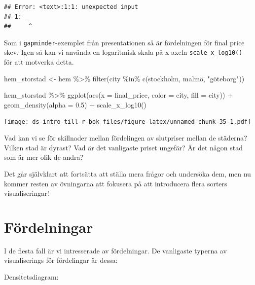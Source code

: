 \documentclass[
]{book}
\newenvironment{Shaded}{\begin{snugshade}}{\end{snugshade}}
\newcommand{\AttributeTok}[1]{\textcolor[rgb]{0.77,0.63,0.00}{#1}}
\newcommand{\FloatTok}[1]{\textcolor[rgb]{0.00,0.00,0.81}{#1}}
\newcommand{\FunctionTok}[1]{\textcolor[rgb]{0.00,0.00,0.00}{#1}}
\newcommand{\NormalTok}[1]{#1}
\newcommand{\OtherTok}[1]{\textcolor[rgb]{0.56,0.35,0.01}{#1}}
\newcommand{\SpecialCharTok}[1]{\textcolor[rgb]{0.00,0.00,0.00}{#1}}
\newcommand{\StringTok}[1]{\textcolor[rgb]{0.31,0.60,0.02}{#1}}
\begin{document}
\begin{verbatim}
## Error: <text>:1:1: unexpected input
## 1: _
##     ^
\end{verbatim}

Som i \texttt{gapminder}-exemplet från presentationen så är fördelningen för final price skev.
Igen så kan vi använda en logaritmisk skala på x axeln \texttt{scale\_x\_log10()} för att motverka detta.

\begin{Shaded}
\begin{Highlighting}[]
\NormalTok{hem\_storstad }\OtherTok{\textless{}{-}}\NormalTok{ hem }\SpecialCharTok{\%\textgreater{}\%} \FunctionTok{filter}\NormalTok{(city }\SpecialCharTok{\%in\%} \FunctionTok{c}\NormalTok{(}\StringTok{\textquotesingle{}stockholm\textquotesingle{}}\NormalTok{, }\StringTok{\textquotesingle{}malmö\textquotesingle{}}\NormalTok{, }\StringTok{"göteborg"}\NormalTok{))}

\NormalTok{hem\_storstad }\SpecialCharTok{\%\textgreater{}\%} \FunctionTok{ggplot}\NormalTok{(}\FunctionTok{aes}\NormalTok{(}\AttributeTok{x =}\NormalTok{ final\_price, }
                            \AttributeTok{color =}\NormalTok{ city, }\AttributeTok{fill =}\NormalTok{ city)) }\SpecialCharTok{+}
  \FunctionTok{geom\_density}\NormalTok{(}\AttributeTok{alpha =} \FloatTok{0.5}\NormalTok{) }\SpecialCharTok{+}
  \FunctionTok{scale\_x\_log10}\NormalTok{()}
\end{Highlighting}
\end{Shaded}

\texttt{[image: ds-intro-till-r-bok\_files/figure-latex/unnamed-chunk-35-1.pdf]}

Vad kan vi se för skillnader mellan fördelingen av slutpriser mellan de städerna?
Vilken stad är dyrast?
Vad är det vanligaste priset ungefär?
Är det någon stad som är mer olik de andra?

Det går självklart att fortsätta att ställa mera frågor och undersöka dem, men nu kommer resten av övningarna att fokusera på att introducera flera sorters visualiseringar!

\hypertarget{fuxf6rdelningar}{%
\section{Fördelningar}\label{fuxf6rdelningar}}

I de flesta fall är vi intresserade av fördelningar. De vanligaste typerna av visualiserings för fördelingar är dessa:

Densitetsdiagram:
\end{document}
